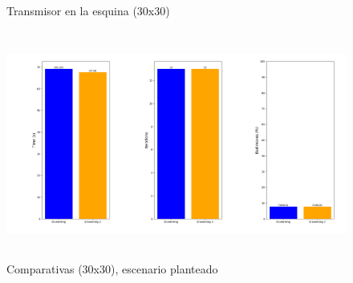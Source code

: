\begin{figure} [tp]
	\centering
	\quad
	\caption{Transmisor en la esquina (30x30)}
	\label{fig:map_p_diff_30}
\end{figure}

\begin{figure} [tp]
    \begin{center}
    \includegraphics[height=7.5cm]{imagenes/cap4/26_comp_diff.png}
    \end{center}
    \caption[Comparativas (30x30), escenario planteado]{Comparativas (30x30), escenario planteado}
    \label{fig:comp_diff_30}
\end{figure}

